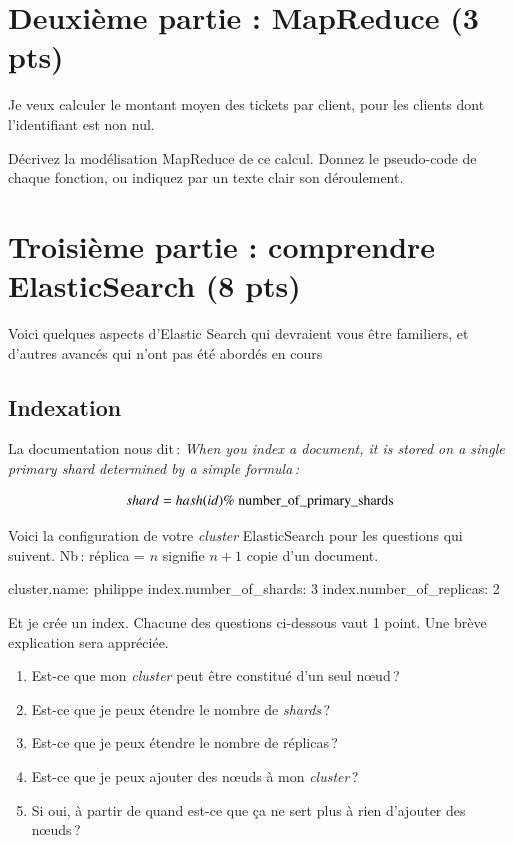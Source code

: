 \documentclass[11pt,a4paper]{article}
\newenvironment{smallverbatim}%
{\endgraf\small\verbatim}{\endverbatim}
\begin{document}
\section*{Deuxième partie : MapReduce (3 pts)}

Je veux calculer le montant moyen des tickets par client, pour les clients dont
 l'identifiant est non nul. 

Décrivez la modélisation MapReduce de ce calcul. 
 Donnez le pseudo-code de chaque
fonction, ou indiquez par un texte clair son déroulement.


\section*{Troisième partie : comprendre ElasticSearch (8 pts)}

Voici quelques aspects d'Elastic Search qui devraient vous être familiers, 
et d'autres avancés qui n'ont pas été abordés en cours

\subsection*{Indexation}

La documentation nous dit\,:
\textit{When you index a document, it is stored on a single primary shard determined by a simple formula\,:}

    $$shard = hash(id) \%\ \rm{number\_of\_primary\_shards}$$
    
Voici la configuration de votre \textit{cluster} ElasticSearch pour les questions qui suivent.
Nb\,: réplica = $n$ signifie $n+1$ copie d'un document.

   \begin{smallverbatim}
cluster.name: philippe
index.number_of_shards: 3
index.number_of_replicas: 2
   \end{smallverbatim} 

Et je crée un index. Chacune des questions ci-dessous vaut 1 point. Une brève explication sera appréciée.

\begin{enumerate}
       \item Est-ce que mon \textit{cluster} peut être constitué d'un seul n{\oe}ud\,?
       \item Est-ce que je peux étendre le nombre de \textit{shards}\,?
       \item Est-ce que je peux étendre le nombre de réplicas\,?
       \item Est-ce que je peux ajouter des n{\oe}uds à mon \textit{cluster}\,?
       \item Si oui, à partir de quand est-ce que ça ne sert plus à rien d'ajouter des n{\oe}uds\,?
    \end{enumerate}
\end{document}
